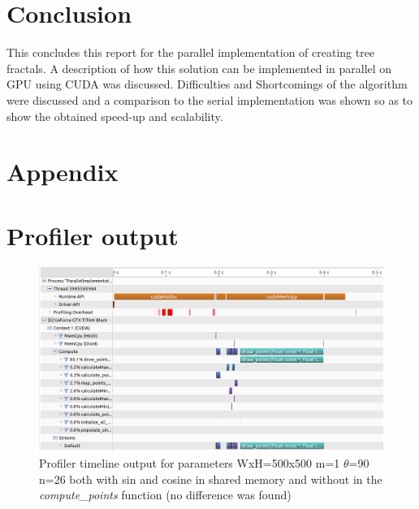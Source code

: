 \documentclass[11pt]{article}
\begin{document}




\section{Conclusion}
This concludes this report for the parallel implementation of creating tree fractals. A description of how this solution can be implemented in parallel on GPU using CUDA was discussed. Difficulties and Shortcomings of the algorithm were discussed and a comparison to the serial implementation was shown so as to show the obtained speed-up and scalability.




\onecolumn
\section*{Appendix}
\appendix
\section{Profiler output}
\begin{figure}[H]
	\includegraphics[width=.95\linewidth]{Images/500x500_1_90_26_profilerOutput.png}
	\centering
	\caption{Profiler timeline output for parameters WxH=500x500 m=1 $\theta$=90 n=26 both with sin and cosine in shared memory and without in the \textit{compute\_points} function (no difference was found)}
	\label{fig:profiler}
\end{figure}

\pagebreak

%
\end{document}
